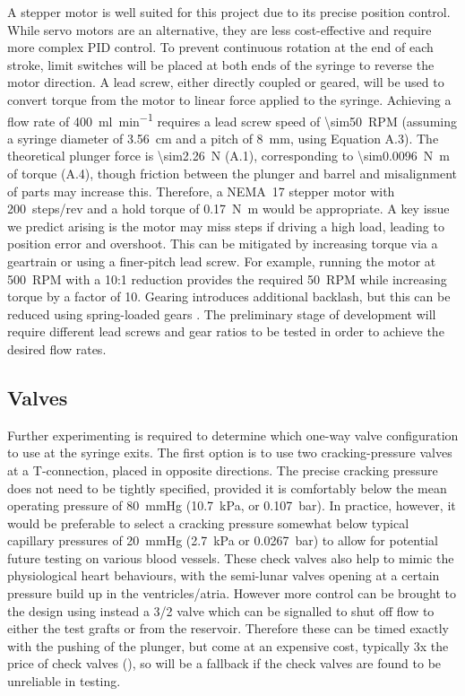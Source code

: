 \documentclass[10pt, a4paper]{article}
\begin{document}
A stepper motor is well suited for this project due to its precise position control. While servo motors are an alternative, they are less cost-effective and require more complex PID control. To prevent continuous rotation at the end of each stroke, limit switches will be placed at both ends of the syringe to reverse the motor direction.
A lead screw, either directly coupled or geared, will be used to convert torque from the motor to linear force applied to the syringe. Achieving a flow rate of \qty{400}{\milli\litre\per\minute} requires a lead screw speed of \qty{\sim50}{RPM} (assuming a syringe diameter of \qty{3.56}{\centi\metre} and a pitch of \qty{8}{\milli\metre}, using Equation A.3). The theoretical plunger force is \qty{\sim2.26}{\newton} (A.1), corresponding to \qty{\sim0.0096}{\newton\metre} of torque (A.4), though friction between the plunger and barrel and misalignment of parts may increase this. Therefore, a NEMA~17 stepper motor with 200~steps/rev and a hold torque of \qty{0.17}{\newton\metre} would be appropriate.
A key issue we predict arising is the motor may miss steps if driving a high load, leading to position error and overshoot. This can be mitigated by increasing torque via a geartrain or using a finer-pitch lead screw. For example, running the motor at \qty{500}{RPM} with a 10:1 reduction provides the required \qty{50}{RPM} while increasing torque by a factor of 10. Gearing introduces additional backlash, but this can be reduced using spring-loaded gears \cite{NonBacklashSpur}. The preliminary stage of development will require different lead screws and gear ratios to be tested in order to achieve the desired flow rates.

\subsection{Valves}

Further experimenting is required to determine which one-way valve configuration to use at the syringe exits. The first option is to use two cracking-pressure valves at a T-connection, placed in opposite directions. The precise cracking pressure does not need to be tightly specified, provided it is comfortably below the mean operating pressure of \qty{80}{\mmHg} (\qty{10.7}{\kilo\pascal}, or \qty{0.107}{\bar}). In practice, however, it would be preferable to select a cracking pressure somewhat below typical capillary pressures of \qty{20}{\mmHg} (\qty{2.7}{\kilo\pascal} or \qty{0.0267}{\bar}) to allow for potential future testing on various blood vessels. These check valves also help to mimic the physiological heart behaviours, with the semi-lunar valves opening at a certain pressure build up in the ventricles/atria. However more control can be brought to the design using instead a 3/2 valve which can be signalled to shut off flow to either the test grafts or from the reservoir. Therefore these can be timed exactly with the pushing of the plunger, but come at an expensive cost, typically 3x the price of check valves (\cite{PneumaticSolenoidValve}), so will be a fallback if the check valves are found to be unreliable in testing.
\end{document}
